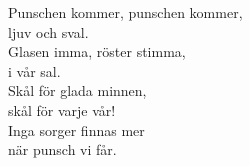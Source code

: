 \documentclass[a6paper, 10pt, twoside]{article}
\begin{document}
\noindent
{}
\small
\begin{center}
\end{center}
\begin{lyrics}
Punschen kommer, punschen kommer,\\
ljuv och sval.\\
Glasen imma, röster stimma,\\
i vår sal.\\
Skål för glada minnen,\\
skål för varje vår!\\
Inga sorger finnas mer\\
när punsch vi får.
\end{lyrics}
\vspace{10pt}\\
\end{document}
